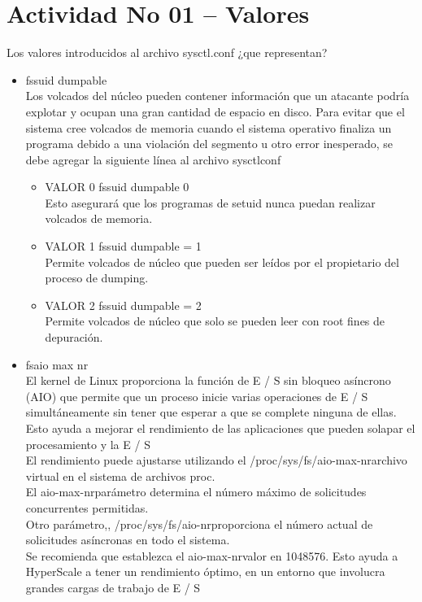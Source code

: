 \section{Actividad No 01 – Valores} 

Los valores introducidos al archivo sysctl.conf ¿que representan?

\begin{itemize}
	\item fssuid dumpable
	\\Los volcados del núcleo pueden contener información que un atacante podría explotar y ocupan una gran cantidad de espacio en disco. Para evitar que el 			sistema cree volcados de memoria cuando el sistema operativo finaliza un programa debido a una violación del segmento u otro error inesperado, se debe 			agregar la siguiente línea al archivo sysctlconf
	\begin{itemize}
			\item VALOR 0  	fssuid dumpable  0
			\\Esto asegurará que los programas de setuid nunca puedan realizar volcados de memoria.
			\item VALOR 1  	fssuid dumpable = 1
			\\Permite volcados de núcleo que pueden ser leídos por el propietario del proceso de dumping.
			\item VALOR 2	 fssuid dumpable = 2	
			\\Permite volcados de núcleo que solo se pueden leer con root fines de depuración.
		\end{itemize}

	\item fsaio max nr
	\\El kernel de Linux proporciona la función de E / S sin bloqueo asíncrono (AIO) que permite que un proceso inicie varias operaciones de E / S 					simultáneamente sin tener que esperar a que se complete ninguna de ellas. Esto ayuda a mejorar el rendimiento de las aplicaciones que pueden solapar el 			procesamiento y la E / S
	\\El rendimiento puede ajustarse utilizando el /proc/sys/fs/aio-max-nrarchivo virtual en el sistema de archivos proc. 
	\\El aio-max-nrparámetro determina el número máximo de solicitudes concurrentes permitidas.
	\\Otro parámetro,, /proc/sys/fs/aio-nrproporciona el número actual de solicitudes asíncronas en todo el sistema.
	\\Se recomienda que establezca el aio-max-nrvalor en 1048576. Esto ayuda a HyperScale a tener un rendimiento óptimo, en un entorno que involucra grandes cargas de trabajo de E / S


\end{itemize}
